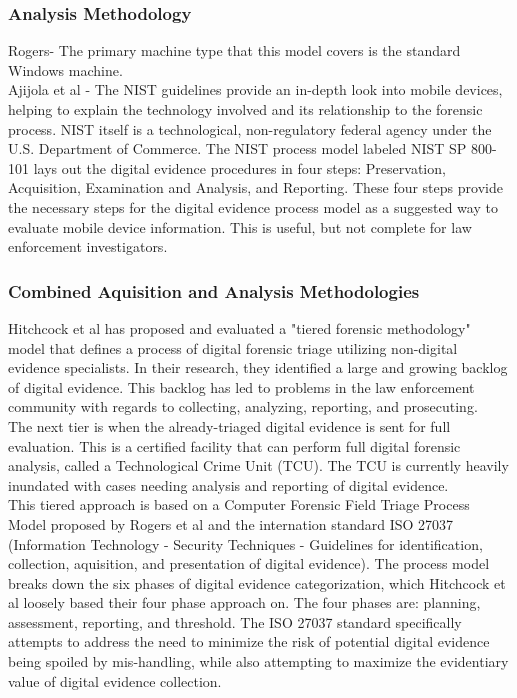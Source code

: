 \documentclass[12pt]{article}
\begin{document}
\subsubsection{Analysis Methodology}
Rogers- The primary machine type
that this model covers is the standard Windows machine.\\

Ajijola et al\cite{ajijola2014review} - The NIST guidelines provide an in-depth look into mobile devices, helping to explain the technology involved and its
relationship to the forensic process.  NIST itself is a technological, non-regulatory federal agency under the U.S.
Department of Commerce.  The NIST process model labeled NIST SP 800-101 lays out the digital evidence procedures in
four steps: Preservation, Acquisition, Examination and Analysis, and Reporting.  These four steps provide the
necessary steps for the digital evidence process model as a suggested way to evaluate mobile device information.  This
is useful, but not complete for law enforcement investigators.\\

\subsubsection{Combined Aquisition and Analysis Methodologies}
Hitchcock et al\cite{hitchcock2016tiered} has proposed and evaluated a "tiered forensic methodology" model that defines
a process of digital forensic triage utilizing non-digital evidence specialists.  In their research, they identified
a large and growing backlog of digital evidence.  This backlog has led to problems in the law enforcement community
with regards to collecting, analyzing, reporting, and prosecuting.\\

The next tier is when the already-triaged digital evidence is sent for full evaluation.  This is a certified facility
that can perform full digital forensic analysis, called a Technological Crime Unit (TCU).  The TCU is currently
heavily inundated with cases needing analysis and reporting of digital evidence.\\

This tiered approach is based on a Computer Forensic Field Triage Process Model proposed by Rogers et al
\cite{rogers2006computer} and the internation standard ISO 27037 (Information Technology - Security Techniques - 
Guidelines for identification, collection, aquisition, and presentation of digital evidence). The process model 
breaks down the six phases of digital evidence categorization, which Hitchcock et al\cite{hitchcock2016tiered} loosely
based their four phase approach on.  The four phases are: planning, assessment, reporting, and threshold.  The ISO
27037 standard specifically attempts to address the need to minimize the risk of potential digital evidence being
spoiled by mis-handling, while also attempting to maximize the evidentiary value of digital evidence collection.\\
\end{document}

